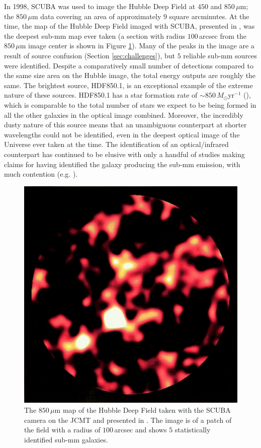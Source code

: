 In 1998, SCUBA was used to image the Hubble Deep Field at $450$ and $850\,\mu$m; the $850\,\mu$m data covering an area of approximately $9$ square arcminutes. At the time, the map of the Hubble Deep Field imaged with SCUBA, presented in \citealt{Hughes_1998}, was the deepest sub-mm map ever taken (a section with radius $100\,$arcsec from the $850\,\mu$m image center is shown in Figure \ref{fig:hubble_deep_field_scuba}). Many of the peaks in the image are a result of source confusion (Section \ref{sec:challenges}), but $5$ reliable sub-mm sources were identified. Despite a comparatively small number of detections compared to the same size area on the Hubble image, the total energy outputs are roughly the same. The brightest source, HDF850.1, is an exceptional example of the extreme nature of these sources. HDF850.1 has a star formation rate of $\sim 850\,M_\odot$yr$^{-1}$ (\citealt{Walter_2012}), which is comparable to the total number of stars we expect to be being formed in all the other galaxies in the optical image combined. Moreover, the incredibly dusty nature of this source means that an unambiguous counterpart at shorter wavelengths could not be identified, even in the deepest optical image of the Universe ever taken at the time. The identification of an optical/infrared counterpart has continued to be elusive with only a handful of studies making claims for having identified the galaxy producing the sub-mm emission, with much contention (e.g. \citealt{Dunlop_2004, Serjeant_2014, Sun_2023}).

\begin{figure}
    \centering
	\includegraphics[width=0.8\columnwidth]{Figures/hubble_deep_field_scuba.pdf}
	\caption[Hubble Deep Field as captured by SCUBA on the JCMT]{The $850\,\mu$m map of the Hubble Deep Field taken with the SCUBA camera on the JCMT and presented in \citealt{Hughes_1998}. The image is of a patch of the field with a radius of $100\,$arcsec and shows $5$ statistically identified sub-mm galaxies.}
	\label{fig:hubble_deep_field_scuba}
\end{figure}

